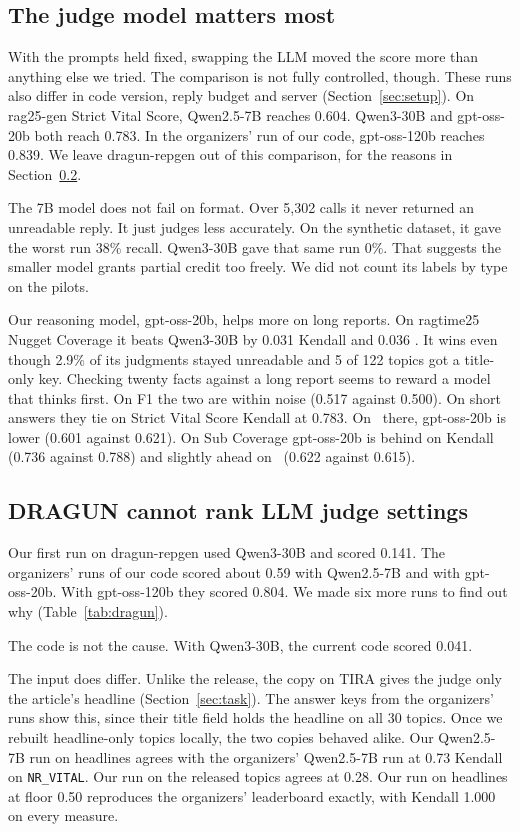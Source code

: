 \subsection{The judge model matters most}

With the prompts held fixed, swapping the LLM moved the score more than anything
else we tried. The comparison is not fully controlled, though. These runs also
differ in code version, reply budget and server
(Section~\ref{sec:setup}). On rag25-gen Strict Vital Score, Qwen2.5-7B reaches
0.604. Qwen3-30B and gpt-oss-20b both reach 0.783. In the organizers' run of our
code, gpt-oss-120b reaches 0.839. We leave dragun-repgen out of this comparison,
for the reasons in Section~\ref{sec:dragun}.

The 7B model does not fail on format. Over 5,302 calls it never returned an
unreadable reply. It just judges less accurately. On the synthetic dataset, it gave the worst run 38\% recall. Qwen3-30B gave
that same run 0\%. That suggests the smaller model grants partial credit too
freely. We did not count its labels by type on the pilots.

Our reasoning model, gpt-oss-20b, helps more on long reports. On ragtime25 Nugget Coverage it beats Qwen3-30B by 0.031 Kendall and
0.036 \tauap. It wins even though 2.9\% of its judgments stayed unreadable and 5 of 122 topics got a title-only key. Checking twenty facts against a long report seems to reward a model
that thinks first. On F1 the two are within noise (0.517 against 0.500). On short
answers they tie on Strict Vital Score Kendall at 0.783. On \tauap\ there,
gpt-oss-20b is lower (0.601 against 0.621). On Sub Coverage gpt-oss-20b is behind
on Kendall (0.736 against 0.788) and slightly ahead on \tauap\ (0.622 against 0.615).

\subsection{DRAGUN cannot rank LLM judge settings}
\label{sec:dragun}

Our first  run on dragun-repgen used Qwen3-30B and scored
0.141. The organizers' runs of our code scored about 0.59 with Qwen2.5-7B and with
gpt-oss-20b. With gpt-oss-120b they scored 0.804. We made six more runs to find out
why (Table~\ref{tab:dragun}).

The code is not the cause. With Qwen3-30B, the current code scored 0.041.

The input does differ. Unlike the release, the copy on TIRA gives the judge only the article's headline (Section~\ref{sec:task}). The answer keys from the organizers'
runs show this, since their title field holds the headline on all 30 topics. Once
we rebuilt headline-only topics locally, the two copies behaved alike. Our
Qwen2.5-7B run on headlines agrees with the organizers' Qwen2.5-7B run at 0.73
Kendall on \texttt{NR\_VITAL}. Our run on the released topics agrees at 0.28. Our
 run on headlines at floor 0.50 reproduces the organizers'
 leaderboard exactly, with Kendall 1.000 on every measure.

